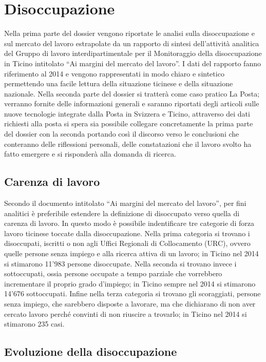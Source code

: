 \section{Disoccupazione}
Nella prima parte del dossier vengono riportate le analisi sulla disoccupazione e sul mercato del lavoro estrapolate da un rapporto di sintesi dell’attività analitica del Gruppo di lavoro interdipartimentale per il Monitoraggio della disoccupazione in Ticino intitolato “Ai margini del mercato del lavoro”. I dati del rapporto fanno riferimento al 2014 e vengono rappresentati in modo chiaro e sintetico permettendo una facile lettura della situazione ticinese e della situazione nazionale. Nella seconda parte del dossier si tratterà come caso pratico La Posta; verranno fornite delle informazioni generali e saranno riportati degli articoli sulle nuove tecnologie integrate dalla Posta in Svizzera e Ticino, attraverso dei dati richiesti alla posta si spera sia possibile collegare concretamente la prima parte del dossier con la seconda portando così il discorso verso le conclusioni che conteranno delle riflessioni personali, delle constatazioni che il lavoro svolto ha fatto emergere e si risponderà alla domanda di ricerca.
\subsection{Carenza di lavoro}
Secondo il documento intitolato “Ai margini del mercato del lavoro”, per fini analitici è preferibile estendere la definizione di disoccupato verso quella di carenza di lavoro. In questo modo è possibile indentificare tre categorie di forza lavoro ticinese toccate dalla disoccupazione. Nella prima categoria si trovano i disoccupati, iscritti o non agli Uffici Regionali di Collocamento (URC), ovvero quelle persone senza impiego e alla ricerca attiva di un lavoro; in Ticino nel 2014 si stimarono 11'983 persone disoccupate. Nella seconda si trovano invece i sottoccupati, ossia persone occupate a tempo parziale che vorrebbero incrementare il proprio grado d’impiego; in Ticino sempre nel 2014 si stimarono 14'676 sottoccupati. Infine nella terza categoria si trovano gli scoraggiati, persone senza impiego, che sarebbero disposte a lavorare, ma che dichiarano di non aver cercato lavoro perché convinti di non riuscire a trovarlo; in Ticino nel 2014 si stimarono 235 casi.
\subsection{Evoluzione della disoccupazione}
